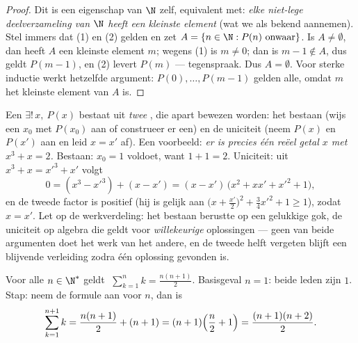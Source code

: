 \begin{proof}
Dit is een eigenschap van $\N$ zelf, equivalent met: \emph{elke
niet-lege deelverzameling van $\N$ heeft een kleinste element} (wat we
als bekend aannemen). Stel immers dat (1) en (2) gelden en zet $A = \{n
\in \N : P(n) \text{ onwaar}\}$. Is $A \neq \emptyset$, dan heeft $A$
een kleinste element $m$; wegens (1) is $m \neq 0$; dan is $m - 1 \notin
A$, dus geldt $P(m-1)$, en (2) levert $P(m)$ --- tegenspraak. Dus $A =
\emptyset$. Voor sterke inductie werkt hetzelfde argument: $P(0), \dots,
P(m-1)$ gelden alle, omdat $m$ het kleinste element van $A$ is.
\end{proof}

\begin{example}\label{ex:b1:logic:uniqueexistence}
Een  $\exists!\,x,\ P(x)$ bestaat uit \emph{twee} ,
die apart bewezen worden: het bestaan (wijs een $x_0$ met $P(x_0)$ aan of
construeer er een) en de uniciteit (neem $P(x)$ en $P(x')$ aan en leid
$x = x'$ af). Een voorbeeld: \emph{er is precies één reëel getal $x$ met
$x^3 + x = 2$.} Bestaan: $x_0 = 1$ voldoet, want $1 + 1 = 2$. Uniciteit:
uit $x^3 + x = x'^3 + x'$ volgt
\[
0 = (x^3 - x'^3) + (x - x')
= (x - x')\,\bigl(x^2 + xx' + x'^2 + 1\bigr),
\]
en de tweede factor is positief (hij is gelijk aan $\bigl(x +
\tfrac{x'}2\bigr)^2 + \tfrac34 x'^2 + 1 \geq 1$), zodat $x = x'$. Let op
de werkverdeling: het bestaan berustte op een gelukkige gok, de uniciteit
op algebra die geldt voor \emph{willekeurige} oplossingen --- geen van
beide argumenten doet het werk van het andere, en de tweede helft
vergeten blijft een blijvende verleiding zodra één oplossing gevonden is.
\end{example}

\begin{example}\label{ex:b1:logic:induction}
Voor alle $n \in \N^*$ geldt $\;\sum_{k=1}^n k = \frac{n(n+1)}{2}$.
Basisgeval $n = 1$: beide leden zijn $1$. Stap: neem de formule aan voor
$n$, dan is
\[
\sum_{k=1}^{n+1} k = \frac{n(n+1)}{2} + (n+1)
= (n+1)\Bigl(\frac n2 + 1\Bigr) = \frac{(n+1)(n+2)}{2}. \qedhere
\]
\end{example}

